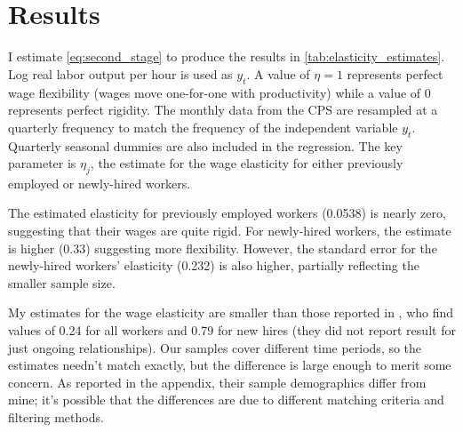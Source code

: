 \documentclass[11pt]{article}
\begin{document}

\section{Results}
\label{sec:results}

I estimate \autoref{eq:second_stage} to produce the results in \autoref{tab:elasticity_estimates}.
Log real labor output per hour is used as $y_t$.
A value of $\eta = 1$ represents perfect wage flexibility (wages move one-for-one with productivity) while a value of 0 represents perfect rigidity.
The monthly data from the CPS are resampled at a quarterly frequency to match the frequency of the independent variable $y_t$.
Quarterly seasonal dummies are also included in the regression.
The key parameter is $\eta_j$, the estimate for the wage elasticity for either previously employed or newly-hired workers.

The estimated elasticity for previously employed workers (0.0538) is nearly zero, suggesting that their wages are quite rigid.
For newly-hired workers, the estimate is higher (0.33) suggesting more flexibility.
However, the standard error for the newly-hired workers' elasticity (0.232) is also higher, partially reflecting the smaller sample size.

My estimates for the wage elasticity are smaller than those reported in \cite{haefke_sonntag_vanRens_2013},  who find values of 0.24 for all workers and 0.79 for new hires (they did not report result for just ongoing relationships).
Our samples cover different time periods, so the estimates needn't match exactly, but the difference is large enough to merit some concern.
As reported in the appendix, their sample demographics differ from mine;
it's possible that the differences are due to different matching criteria and filtering methods.
\end{document}
